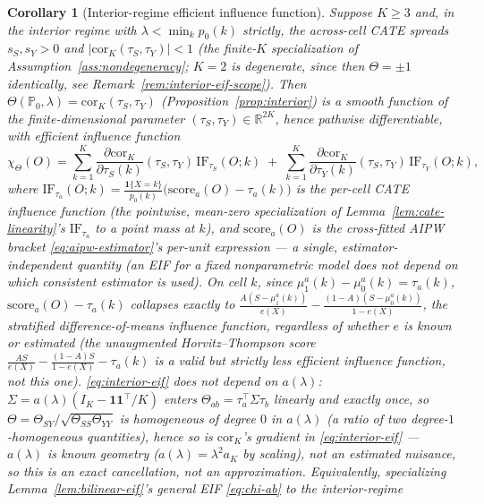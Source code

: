 \documentclass[11pt]{article}
\theoremstyle{plain}
\newtheorem{corollary}[theorem]{Corollary}
\theoremstyle{definition}
\theoremstyle{remark}
\newcommand{\PP}{\mathbb{P}}
\newcommand{\R}{\mathbb{R}}
\newcommand{\IF}{\mathrm{IF}}
\newcommand{\Corr}{\mathrm{cor}}
\begin{document}
\begin{corollary}[Interior-regime efficient influence function]\label{cor:interior-eif}
Suppose $K\ge3$ and, in the interior regime with $\lambda<\min_kp_0(k)$
\emph{strictly}, the across-cell CATE spreads $s_S,s_Y>0$ and
$|\Corr_K(\tau_S,\tau_Y)|<1$ (the finite-$K$ specialization of
Assumption~\ref{ass:nondegeneracy}; $K=2$ is degenerate, since then
$\Theta=\pm1$ identically, see Remark~\ref{rem:interior-eif-scope}). Then
$\Theta(\PP_0,\lambda)=\Corr_K(\tau_S,\tau_Y)$ (Proposition~\ref{prop:interior}) is a
smooth function of the finite-dimensional parameter $(\tau_S,\tau_Y)\in\R^{2K}$,
hence pathwise differentiable, with efficient influence function
\begin{equation}\label{eq:interior-eif}
    \chi_\Theta(O) = \sum_{k=1}^K\frac{\partial\Corr_K}{\partial\tau_S(k)}(\tau_S,\tau_Y)\,\IF_{\tau_S}(O;k)
    \;+\; \sum_{k=1}^K\frac{\partial\Corr_K}{\partial\tau_Y(k)}(\tau_S,\tau_Y)\,\IF_{\tau_Y}(O;k),
\end{equation}
where $\IF_{\tau_a}(O;k)=\frac{\mathbf1\{X=k\}}{p_0(k)}\big(\mathrm{score}_a(O)-\tau_a(k)\big)$
is the per-cell CATE influence function (the pointwise, mean-zero specialization of
Lemma~\ref{lem:cate-linearity}'s $\IF_{\tau_a}$ to a point mass at $k$), and
$\mathrm{score}_a(O)$ is the cross-fitted AIPW bracket \eqref{eq:aipw-estimator}'s
per-unit expression --- a single, estimator-independent quantity (an EIF for a fixed
nonparametric model does not depend on which consistent estimator is used). On cell
$k$, since $\mu_1^a(k)-\mu_0^a(k)=\tau_a(k)$, $\mathrm{score}_a(O)-\tau_a(k)$
collapses exactly to $\frac{A(S-\mu_1^a(k))}{e(X)}-\frac{(1-A)(S-\mu_0^a(k))}{1-e(X)}$,
the \emph{stratified difference-of-means} influence function, regardless of whether
$e$ is known or estimated (the unaugmented Horvitz--Thompson score
$\frac{AS}{e(X)}-\frac{(1-A)S}{1-e(X)}-\tau_a(k)$ is a valid but strictly less
efficient influence function, not this one). \eqref{eq:interior-eif} does not depend on $a(\lambda)$: $\Sigma=a(\lambda)(I_K-\mathbf1\mathbf1^\top/K)$
enters $\Theta_{ab}=\tau_a^\top\Sigma\tau_b$ linearly and exactly once, so
$\Theta=\Theta_{SY}/\sqrt{\Theta_{SS}\Theta_{YY}}$ is homogeneous of degree $0$ in
$a(\lambda)$ (a ratio of two degree-$1$-homogeneous quantities), hence so is
$\Corr_K$'s gradient in \eqref{eq:interior-eif} --- $a(\lambda)$ is known geometry
($a(\lambda)=\lambda^2a_K$ by scaling), not an estimated nuisance, so this is an
exact cancellation, not an approximation. Equivalently, specializing
Lemma~\ref{lem:bilinear-eif}'s general EIF \eqref{eq:chi-ab} to the interior-regime

\end{corollary}
\end{document}
